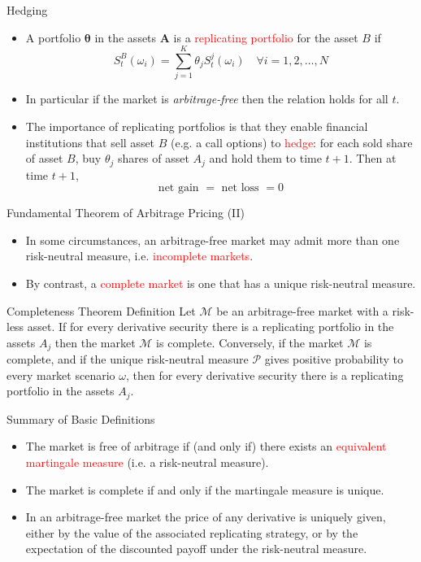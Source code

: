 \documentclass{beamer}
\begin{document}
\begin{frame}{Hedging}
	\begin{itemize}
		\item A portfolio $\mathbf{\theta}$ in the assets $\mathbf{A}$ is a \textcolor{red}{replicating portfolio} for the asset $B$ if
		\begin{equation}
			S_t^{B}(\omega_i) = \sum_{j=1}^K \theta_j S_t^j(\omega_i)\quad\forall i=1,2,\ldots,N
		\end{equation}
		\item In particular if the market is \emph{arbitrage-free} then the relation holds for all $t$.
		\item The importance of replicating portfolios is that they enable financial institutions that sell
		asset $B$ (e.g. a call options) to \textcolor{red}{hedge}: for each sold share of asset $B$, buy $\theta_j$ shares
		of asset $A_j$ and hold them to time $t + 1$. Then at time $t + 1$, 
		\begin{equation*}
			\text{net gain }= \text{ net loss } = 0
		\end{equation*}
	\end{itemize}
\end{frame}

\begin{frame}{Fundamental Theorem of Arbitrage Pricing (II)}
	\begin{itemize}
		\item In some circumstances, an arbitrage-free market may admit more than one risk-neutral measure, i.e. \textcolor{red}{incomplete markets}.
		\item By contrast, a \textcolor{red}{complete market} is one that has a unique risk-neutral measure.
	\end{itemize}
	\begin{block}{Completeness Theorem Definition}
		Let $\mathcal{M}$ be an arbitrage-free market with a risk-less asset. If for every derivative security there is a replicating portfolio in the assets $A_j$ then the market $\mathcal{M}$ is complete. Conversely, if the market $\mathcal{M}$ is complete, and if the unique risk-neutral measure $\mathcal{P}$ gives positive probability to every market scenario $\omega$, then for every
		derivative security there is a replicating portfolio in the assets $A_j$.
	\end{block}
\end{frame}

\begin{frame}{Summary of Basic Definitions}
	\begin{itemize}
		\item The market is free of arbitrage if (and only if) there exists an \textcolor{red}{equivalent martingale measure} (i.e. a risk-neutral measure).
		\item The market is complete if and only if the martingale measure is unique.
		\item In an arbitrage-free market the price of any derivative is uniquely given, either by the value of the associated replicating strategy, or by the expectation of the discounted payoff under the risk-neutral measure. 
	\end{itemize}
\end{frame}
\end{document}
